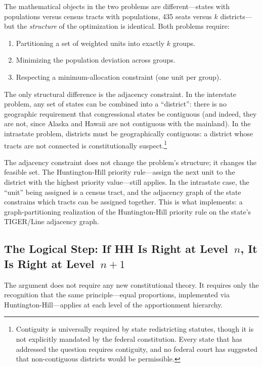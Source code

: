 The mathematical objects in the two problems are different---states with
populations versus census tracts with populations, 435 seats versus
$k$ districts---but the \emph{structure} of the optimization is identical.
Both problems require:
\begin{enumerate}
  \item Partitioning a set of weighted units into exactly $k$ groups.
  \item Minimizing the population deviation across groups.
  \item Respecting a minimum-allocation constraint (one unit per group).
\end{enumerate}

The only structural difference is the adjacency constraint.
In the interstate problem, any set of states can be combined into a
``district'': there is no geographic requirement that congressional
states be contiguous (and indeed, they are not, since Alaska and Hawaii
are not contiguous with the mainland).
In the intrastate problem, districts must be geographically contiguous:
a district whose tracts are not connected is constitutionally suspect.\footnote{%
  Contiguity is universally required by state redistricting statutes,
  though it is not explicitly mandated by the federal constitution.
  Every state that has addressed the question requires contiguity,
  and no federal court has suggested that non-contiguous districts
  would be permissible.
}

The adjacency constraint does not change the problem's structure; it changes
the feasible set.
The Huntington-Hill priority rule---assign the next unit to the district
with the highest priority value---still applies.
In the intrastate case, the ``unit'' being assigned is a census tract,
and the adjacency graph of the state constrains which tracts can be
assigned together.
This is what \ar{} implements: a graph-partitioning realization of the
Huntington-Hill priority rule on the state's TIGER/Line adjacency graph.

\subsection{The Logical Step: If HH Is Right at Level~$n$, It Is Right at Level~$n+1$}

The argument does not require any new constitutional theory.
It requires only the recognition that the same principle---equal proportions,
implemented via Huntington-Hill---applies at each level of the apportionment
hierarchy.

